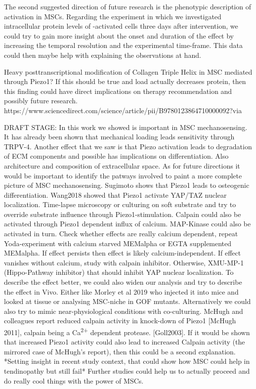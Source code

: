 The second suggested direction of future research is the phenotypic description of \Piezo{} activation in MSCs. Regarding the experiment in which we investigated intracellular protein levels of \Piezo{}-activated cells three days after intervention, we could try to gain more insight about the onset and duration of the effect by increasing the temporal resolution and the experimental time-frame. This data could then maybe help with explaining the observations at hand.

Heavy posttranscriptional modification of Collagen Triple Helix in MSC mediated through Piezo1? If this should be true and load actually decreases protein, then this finding could have direct implications on therapy recommendation and possibly future research. https://www.sciencedirect.com/science/article/pii/B9780123864710000092?via%


DRAFT STAGE: 
In this work we showed \Piezo{} is important in MSC mechanosensing. It has already been shown that mechanical loading leads sensitivity through TRPV-4.  Another effect that we saw is that Piezo activation leads to degradation of ECM components and possible has implications on differentiation. Also architecture and composition of extracellular space.
As for future directions it would be important to identify the patways involved to paint a more complete picture of MSC mechanosensing. Sugimoto shows that Piezo1 leads to osteogenic differentiation. Wang2018 showed that Piezo1 activate YAP/TAZ nuclear localization. Time-lapse microscopy or culturing on soft substrate and try to override substrate influence through Piezo1-stimulation. Calpain could also be activated through Piezo1 dependent influx of calcium. MAP-Kinase could also be activated in turn.  Check whether effects are really calcium dependent, repeat Yoda-experiment with calcium starved MEMalpha or EGTA supplemented MEMalpha. If effect persists then effect is likely calcium-independent. If effect vanishes without calcium, study with calpain inhibitor. Otherwise, XMU-MP-1 (Hippo-Pathway inhibitor) that should inhibit YAP nuclear localization. To describe the effect better, we could also widen our analysis and try to describe the effect in Vivo. Either like Morley et al 2019 who injected it into mice and looked at tissue or analysing MSC-niche in GOF mutants. Alternatively we could also try to mimic near-physiological conditions with co-culturing.
McHugh and colleagues report reduced calpain activity in knock-down of Piezo1 [McHugh 2011], calpain being a Ca\textsuperscript{2+} dependent protease. [Goll2003]. If it would be shown that increased Piezo1 activity could also lead to increased Calpain activity (the mirrored case of McHugh's report), then this could be a second explanation.
*Setting insight in recent study context, that could show how MSC could help in tendinopathy but still fail* Further studies could help us to actually proceed and do really cool things with the power of MSCs. 